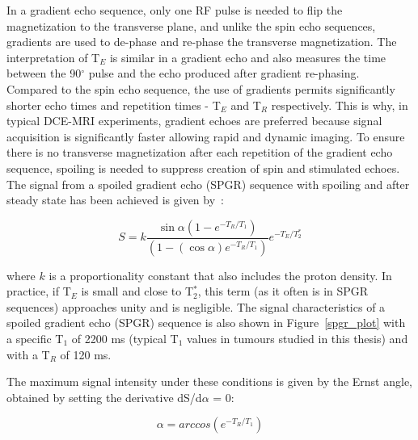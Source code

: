In a gradient echo sequence, only one RF pulse is needed to flip the magnetization to the transverse plane, and unlike the spin echo sequences, gradients are used to de-phase and re-phase the transverse magnetization.
The interpretation of T$_E$ is similar in a gradient echo and also measures the time between the 90$^\circ$ pulse and the echo produced after gradient re-phasing. 
Compared to the spin echo sequence, the use of gradients permits significantly shorter echo times and repetition times - T$_E$ and T$_R$ respectively.
This is why, in typical \acs{DCE-MRI} experiments, gradient echoes are preferred because signal acquisition is significantly faster allowing rapid and dynamic imaging.
To ensure there is no transverse magnetization after each repetition of the gradient echo sequence, spoiling is needed to suppress creation of spin and stimulated echoes.
The signal from a spoiled gradient echo (SPGR) sequence with spoiling and after steady state has been achieved is given by~\cite{Haase:2011fg}:

\begin{equation}
S=k\frac{\sin \alpha\left(1-e^{-T_R / T_1}\right)}{\left(1-(\cos \alpha) e^{-T_R / T_1}\right)} e^{-T_E / T_2^*}
\end{equation}

where $k$ is a proportionality constant that also includes the proton density.
In practice, if T$_E$ is small and close to T$_2^*$, this term (as it often is in SPGR sequences) approaches unity and is negligible. 
The signal characteristics of a spoiled gradient echo (SPGR) sequence is also shown in Figure~\ref{spgr_plot} with a specific T$_1$ of 2200 ms (typical T$_1$ values in tumours studied in this thesis) and with a T$_R$ of 120 ms.

The maximum signal intensity under these conditions is given by the Ernst angle, obtained by setting the derivative dS/d$\alpha$ = 0:

\begin{equation}
\alpha = arccos(e^{-T_R / T_1})
\end{equation}

